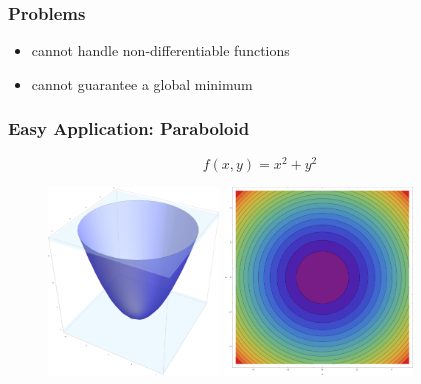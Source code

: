 \documentclass{beamer}
\begin{document}
\begin{frame}
\frametitle{Problems}

\begin{itemize}
    \item cannot handle non-differentiable functions
    \item cannot guarantee a global minimum
\end{itemize}

\end{frame}

\begin{frame}
\frametitle{Easy Application: Paraboloid}


$$f(x,y)=x^2+y^2$$

\begin{figure}
    \includegraphics[height=5cm]{paraboloid}
    \hspace{0.8cm}
    \includegraphics[height=5cm]{paraboloid_levelset}
\end{figure}

\end{frame}
\end{document}
